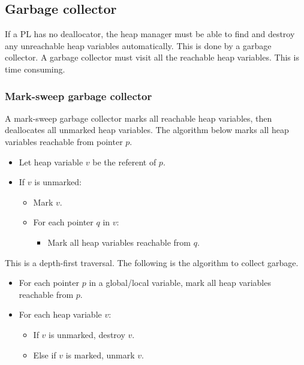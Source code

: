 \documentclass[a4paper, openany]{memoir}
\begin{document}
\subsection{Garbage collector}
If a PL has no deallocator, the heap manager must be able to find and destroy any unreachable heap variables automatically. This is done by a garbage collector. A garbage collector must visit all the reachable heap variables. This is time consuming. 

\subsubsection{Mark-sweep garbage collector}
A mark-sweep garbage collector marks all reachable heap variables, then deallocates all unmarked heap variables. The algorithm below marks all heap variables reachable from pointer $p$.
\begin{itemize}
    \item Let heap variable $v$ be the referent of $p$.
    \item If $v$ is unmarked:
    \begin{itemize}
        \item Mark $v$.
        \item For each pointer $q$ in $v$:
        \begin{itemize}
            \item Mark all heap variables reachable from $q$.
        \end{itemize}
    \end{itemize}
\end{itemize}
This is a depth-first traversal. The following is the algorithm to collect garbage.
\begin{itemize}
    \item For each pointer $p$ in a global/local variable, mark all heap variables reachable from $p$.
    \item For each heap variable $v$:
    \begin{itemize}
        \item If $v$ is unmarked, destroy $v$.
        \item Else if $v$ is marked, unmark $v$.
    \end{itemize}
\end{itemize}
\end{document}
